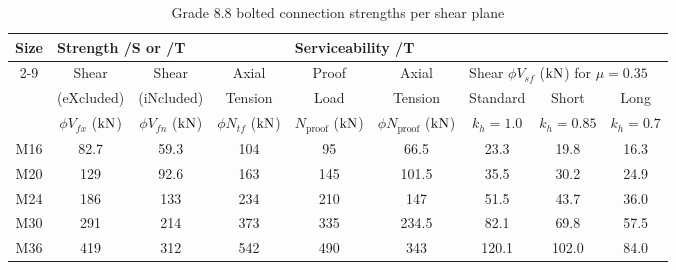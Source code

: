 \begin{table}[H]
\centering\footnotesize
\caption{Grade 8.8 bolted connection strengths per shear plane}\label{tab:bolt8.8}
\begin{tabular}{c|ccc|cc|ccc}
	\toprule
	Size & \multicolumn{3}{l|}{Strength /S or /T}                                                 & \multicolumn{5}{l}{Serviceability /T}                                                                                      \\ \cline{2-9}
	     &            Shear            &            Shear            &           Axial            &         Proof         &            Axial            & \multicolumn{3}{l}{Shear $\phi{}V_{sf}$ ($\si{\kilo\newton}$) for $\mu=0.35$} \\
	     &         (eXcluded)          &         (iNcluded)          &          Tension           &         Load          &           Tension           & Standard &   Short   &                     Long                      \\
	     & $\phi{}V_{fx}$ ($\si{\kilo\newton}$) & $\phi{}V_{fn}$ ($\si{\kilo\newton}$) & $\phi{}N_{tf}$ ($\si{\kilo\newton}$) & $N_\text{proof}$ ($\si{\kilo\newton}$) & $\phi{}N_\text{proof}$ ($\si{\kilo\newton}$) & $k_h=1.0$  & $k_h=0.85$ &                   $k_h=0.7$                    \\ \midrule
	M16  &            82.7             &            59.3             &            104             &          95           &            66.5             &   23.3   &   19.8    &                     16.3                      \\
	M20  &             129             &            92.6             &            163             &          145          &            101.5            &   35.5   &   30.2    &                     24.9                      \\
	M24  &             186             &             133             &            234             &          210          &             147             &   51.5   &   43.7    &                     36.0                      \\
	M30  &             291             &             214             &            373             &          335          &            234.5            &   82.1   &   69.8    &                     57.5                      \\
	M36  &             419             &             312             &            542             &          490          &             343             &  120.1   &   102.0   &                     84.0                      \\ \bottomrule
\end{tabular}
\end{table}

